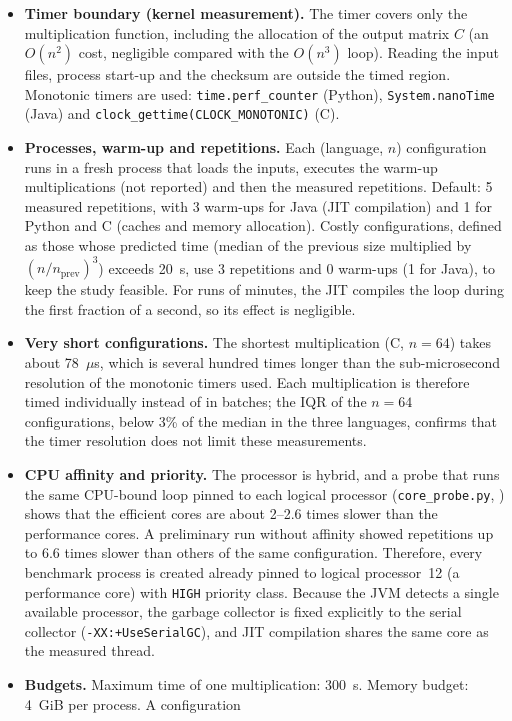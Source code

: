 \documentclass[12pt,a4paper]{report}
\begin{document}
\begin{itemize}
  \item \textbf{Timer boundary (kernel measurement).} The timer covers only the multiplication function, including the
  allocation of the output matrix $C$ (an $O(n^2)$ cost, negligible compared with the $O(n^3)$ loop). Reading the
  input files, process start-up and the checksum are outside the timed region. Monotonic timers are used:
  \texttt{time.perf\_counter} (Python), \texttt{System.nanoTime} (Java) and \texttt{clock\_gettime(CLOCK\_MONOTONIC)} (C).
  \item \textbf{Processes, warm-up and repetitions.} Each (language, $n$) configuration runs in a fresh process that
  loads the inputs, executes the warm-up multiplications (not reported) and then the measured repetitions. Default:
  5 measured repetitions, with 3 warm-ups for Java (JIT compilation) and 1 for Python and C (caches and memory
  allocation). Costly configurations, defined as those whose predicted time (median of the previous size multiplied by
  $(n/n_{\text{prev}})^3$) exceeds 20~s, use 3 repetitions and 0 warm-ups (1 for Java), to keep the study feasible.
  For runs of minutes, the JIT compiles the loop during the first fraction of a second, so its effect is negligible.
  \item \textbf{Very short configurations.} The shortest multiplication (C, $n = 64$) takes about 78~$\mu$s, which is
  several hundred times longer than the sub-microsecond resolution of the monotonic timers used. Each multiplication is
  therefore timed individually instead of in batches; the IQR of the $n = 64$ configurations, below 3\% of the median
  in the three languages, confirms that the timer resolution does not limit these measurements.
  \item \textbf{CPU affinity and priority.} The processor is hybrid, and a probe that runs the same CPU-bound loop
  pinned to each logical processor (\texttt{core\_probe.py}, ) shows that the efficient cores are
  about 2--2.6 times slower than the performance cores. A preliminary run without affinity showed repetitions up to
  6.6 times slower than others of the same configuration. Therefore, every benchmark process is created already pinned
  to logical processor~12 (a performance core) with \texttt{HIGH} priority class. Because the JVM detects a single
  available processor, the garbage collector is fixed explicitly to the serial collector (\texttt{-XX:+UseSerialGC}),
  and JIT compilation shares the same core as the measured thread.
  \item \textbf{Budgets.} Maximum time of one multiplication: 300~s. Memory budget: 4~GiB per process. A configuration

\end{itemize}
\end{document}
